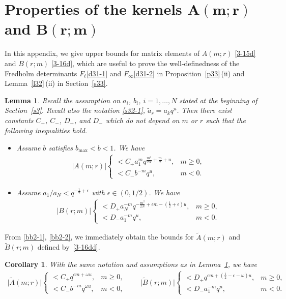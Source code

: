 \documentclass[pdftex]{sigma}
\numberwithin{equation}{section}
\newtheorem{Corollary}[Theorem]{Corollary}
\newtheorem{Lemma}[Theorem]{Lemma}
\def\e{\epsilon}
\def\i{\infty}
\def\o{\omega}
\begin{document}
\section[Properties of the kernels A(m;r) and B(r;m)]{Properties of the kernels $\boldsymbol{A(m;r)}$ and $\boldsymbol{B(r;m)}$}
\label{ab}
 In this appendix, we give upper bounds for matrix elements of $A(m;r)$ \eqref{3-15d} and $B(r;m)$ \eqref{3-16d}, which are useful to prove the well-definedness of the Fredholm determinants $F_{\ell}$\eqref{d31-1} and $F_{\i}$\eqref{d31-2} in Proposition~\ref{p33}\,(ii) and Lemma~\ref{l32}\,(ii) in Section~\ref{s33}.
\begin{Lemma}
\label{lb1}
Recall the assumption on $a_i$, $b_i$, $i=1,\dots,N$ stated at the beginning of Section~{\rm\ref{s3}}. Recall also the notation \eqref{s32-1}, $\tilde{a}_r=a_k q^{u}$. Then there exist constants $C_+$, $C_-$, $D_+$, and $D_-$ which do not depend on $m$ or
$r$ such that the following inequalities hold.
\begin{itemize}\itemsep=0pt
 \item [$(i)$] Assume $b$ satisfies $b_{\max}<b<1$. We have
 \begin{align}
 \label{bb2-1}
 |A(m;r)|
 \begin{cases}
 < C_+ a_{1}^mq^{\frac{m^2}{2N}+\frac{m}{2}+u}, & m\ge 0,
 \\
 < C_- b^{-m} q^{u}, & m<0.
 \end{cases}
 \end{align}
 \item[$(ii)$] Assume $a_{1}/a_{N}<q^{-\frac12+\e}$ with $\e\in(0,1/2)$. We have
 \begin{align}
 \label{bb2-2}
 |B(r;m)|
 \begin{cases}
 < D_+ a_{N}^{-m}q^{-\frac{m^2}{2N}+\e m-(\frac12+\e)u}, & m\ge 0,
 \\
 < D_- a_{1}^{-m}q^{u}, & m<0.
 \end{cases}
 \end{align}
\end{itemize}
\end{Lemma}

From \eqref{bb2-1}, \eqref{bb2-2}, we immediately obtain the bounds
for $\tilde{A}(m;r)$ and $\tilde{B}(r;m)$ defined by~\eqref{3-16dd}.

\begin{Corollary}\label{cb2}
With the same notation and assumptions as in Lemma~{\rm\ref{lb1}},
we have
\begin{align*}%
 \big|\tilde{A}(m;r)\big|
 \begin{cases}
 < C_+ q^{\e m+\o u}, & m\ge 0,
 \\
 < C_- b^{-m} q^{\omega u}, & m<0,
 \end{cases}
 \qquad
 \big|\tilde{B}(r;m)\big|
 \begin{cases}
 < D_+ q^{\e m+(\frac12-\e-\o)u}, & m\ge 0,
 \\
 < D_- a_1^{-m}q^{u}, & m<0.
 \end{cases}
 \end{align*}
 \end{Corollary}
\end{document}
